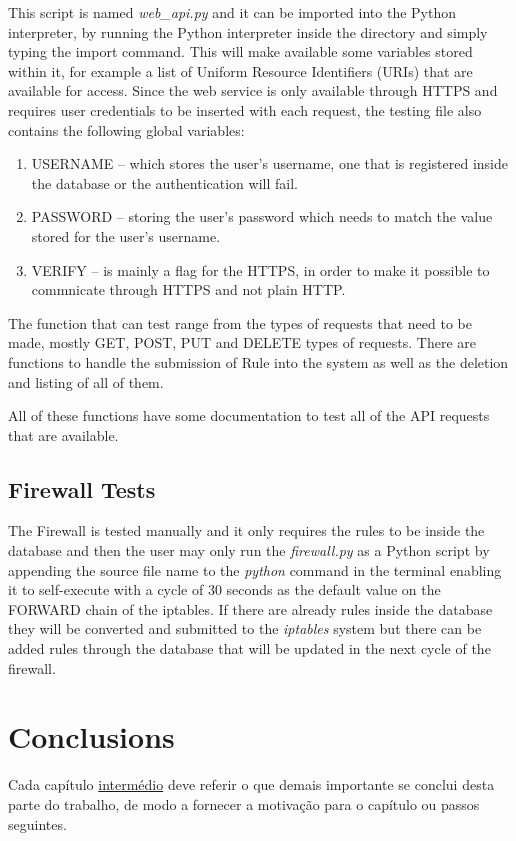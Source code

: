 This script is named \emph{web\_api.py} and it can be imported into the Python
interpreter, by running the Python interpreter inside the directory and simply
typing the import command. This will make available some variables stored within
it, for example a list of Uniform Resource Identifiers (URIs) that are available
for access.
Since the web service is only available through HTTPS and requires user
credentials to be inserted with each request, the testing file also contains the
following global variables:
\begin{enumerate}
	\item USERNAME -- which stores the user's username, one that is registered
		inside the database or the authentication will fail.
	\item PASSWORD -- storing the user's password which needs to match the value
		stored for the user's username.
	\item VERIFY -- is mainly a flag for the HTTPS, in order to make it possible
		to commnicate through HTTPS and not plain HTTP.
\end{enumerate}


The function that can test range from the types of requests that need to be
made, mostly GET, POST, PUT and DELETE types of requests. There are functions to
handle the submission of Rule into the system as well as the deletion and
listing of all of them.

All of these functions have some documentation to test all of the API requests
that are available.

\subsection{Firewall Tests}
\label{chap5:sec:testing:firewall}
The Firewall is tested manually and it only requires the rules to be inside the
database and then the user may only run the \emph{firewall.py} as a Python
script by appending the source file name to the \emph{python} command in the
terminal enabling it to self-execute with a cycle of 30 seconds as the default
value on the FORWARD chain of the iptables.
If there are already rules inside the database they will be converted and
submitted to the \emph{iptables} system but there can be added rules through the
database that will be updated in the next cycle of the firewall.

\section{Conclusions}
\label{chap4:sec:concs}
Cada capítulo \underline{intermédio} deve referir o que demais importante se conclui desta parte do trabalho, de modo a fornecer a motivação para o capítulo ou passos seguintes.
